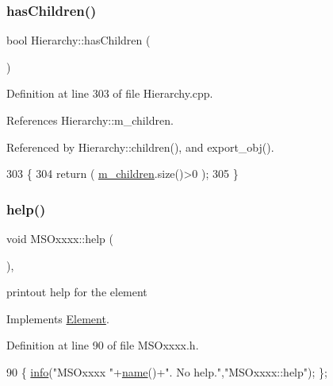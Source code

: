 \subsubsection{\texorpdfstring{has\+Children()}{hasChildren()}}
{\footnotesize\ttfamily bool Hierarchy\+::has\+Children (\begin{DoxyParamCaption}{ }\end{DoxyParamCaption})\hspace{0.3cm}{\ttfamily [inherited]}}



Definition at line 303 of file Hierarchy.\+cpp.



References Hierarchy\+::m\+\_\+children.



Referenced by Hierarchy\+::children(), and export\+\_\+obj().


\begin{DoxyCode}
303                               \{
304   \textcolor{keywordflow}{return} ( \hyperlink{classHierarchy_a038816763941fd4a930504917f60483b}{m\_children}.size()>0 );
305 \}
\end{DoxyCode}
\mbox{\label{classMSOxxxx_a8c22ff23297ada963eaf12b6e0b62017}} 
\subsubsection{\texorpdfstring{help()}{help()}}
{\footnotesize\ttfamily void M\+S\+Oxxxx\+::help (\begin{DoxyParamCaption}{ }\end{DoxyParamCaption})\hspace{0.3cm}{\ttfamily [inline]}, {\ttfamily [virtual]}}

printout help for the element 

Implements \hyperlink{classElement_a32c0de27acb08e17251cef88c3e9303a}{Element}.



Definition at line 90 of file M\+S\+Oxxxx.\+h.


\begin{DoxyCode}
90 \{ \hyperlink{classObject_a644fd329ea4cb85f54fa6846484b84a8}{info}(\textcolor{stringliteral}{"MSOxxxx "}+\hyperlink{classObject_a300f4c05dd468c7bb8b3c968868443c1}{name}()+\textcolor{stringliteral}{". No help."},\textcolor{stringliteral}{"MSOxxxx::help"}); \};
\end{DoxyCode}
\mbox{\label{classMSOxxxx_a0f14b23d31d8e7647184e99a89600cc3}} 

